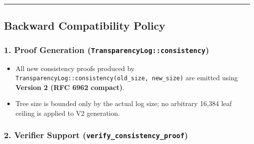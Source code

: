 \documentclass[
]{article}
\providecommand{\tightlist}{%
  \setlength{\itemsep}{0pt}\setlength{\parskip}{0pt}}
\begin{document}
\begin{center}\rule{0.5\linewidth}{0.5pt}\end{center}

\hypertarget{backward-compatibility-policy}{%
\subsection{Backward Compatibility
Policy}\label{backward-compatibility-policy}}

\hypertarget{proof-generation-transparencylogconsistency}{%
\subsubsection{\texorpdfstring{1. Proof Generation
(\texttt{TransparencyLog::consistency})}{1. Proof Generation (TransparencyLog::consistency)}}\label{proof-generation-transparencylogconsistency}}

\begin{itemize}
\tightlist
\item
  All new consistency proofs produced by
  \texttt{TransparencyLog::consistency(old\_size,\ new\_size)} are
  emitted using \textbf{Version 2 (RFC 6962 compact)}.
\item
  Tree size is bounded only by the actual log size; no arbitrary 16,384
  leaf ceiling is applied to V2 generation.
\end{itemize}

\hypertarget{verifier-support-verify_consistency_proof}{%
\subsubsection{\texorpdfstring{2. Verifier Support
(\texttt{verify\_consistency\_proof})}{2. Verifier Support (verify\_consistency\_proof)}}\label{verifier-support-verify_consistency_proof}}
\end{document}
